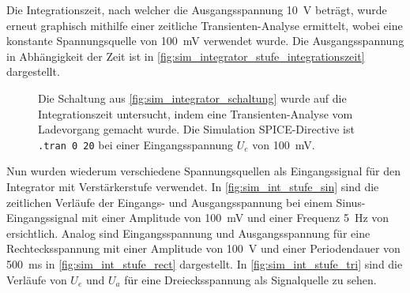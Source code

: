 \documentclass[12pt,english,ngerman]{scrartcl}
\begin{document}
Die Integrationszeit, nach welcher die Ausgangsspannung \SI{10}{\volt} beträgt, wurde erneut graphisch 
mithilfe einer zeitliche Transienten-Analyse ermittelt, wobei eine konstante Spannungsquelle von
\SI{100}{\milli\volt} verwendet wurde. Die Ausgangsspannung in Abhängigkeit der Zeit ist in \autoref{fig:sim_integrator_stufe_integrationszeit} dargestellt.

\begin{figure}[H]
  \centering
  \caption{Die Schaltung aus \autoref{fig:sim_integrator_schaltung} wurde auf
  die Integrationszeit untersucht, indem eine Transienten-Analyse vom
  Ladevorgang gemacht wurde. Die Simulation SPICE-Directive ist \texttt{.tran 0 20} 
  bei einer Eingangsspannung $U_e$ von \SI{100}{\milli\volt}.}
  \label{fig:sim_integrator_stufe_integrationszeit}
\end{figure}

Nun wurden wiederum verschiedene Spannungsquellen als Eingangssignal für den Integrator mit
Verstärkerstufe verwendet. 
In \autoref{fig:sim_int_stufe_sin} sind die zeitlichen Verläufe der Eingangs-
und Ausgangsspannung bei einem Sinus-Eingangssignal mit einer Amplitude von \SI{100}{\milli\volt} und einer 
Frequenz \SI{5}{\hertz} von ersichtlich.
Analog sind Eingangsspannung und Ausgangsspannung für eine Rechtecksspannung mit einer Amplitude von 
\SI{100}{\volt} und einer Periodendauer von \SI{500}{\milli\second} in \autoref{fig:sim_int_stufe_rect}
dargestellt.
In \autoref{fig:sim_int_stufe_tri} sind die Verläufe von $U_e$ und $U_a$ für eine Dreiecksspannung als
Signalquelle zu sehen.

\end{document}

